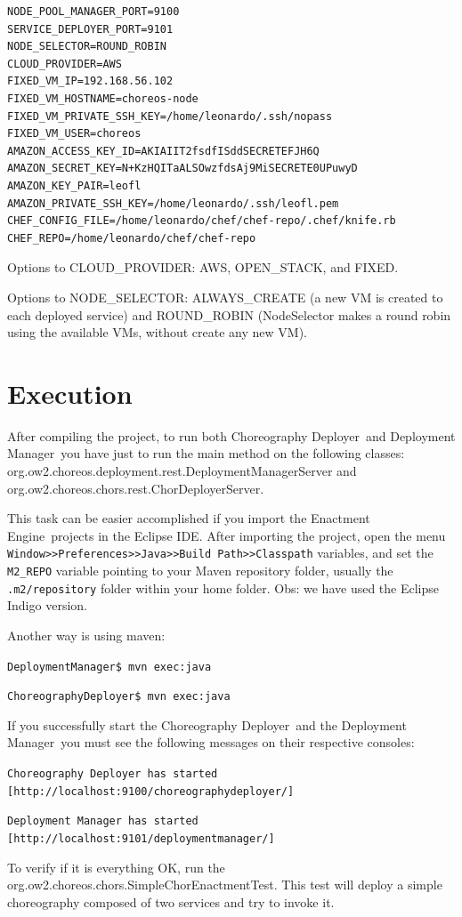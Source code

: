 \documentclass[a4paper, 10pt]{article}
\newcommand{\ee}{Enactment Engine}
\newcommand{\cd}{Choreography Deployer}
\newcommand{\dm}{Deployment Manager}
\begin{document}
\lstset{
numbers=left
}

{\footnotesize
\begin{lstlisting}[caption=deployment.properties example,label=lst:deployment_properties] 
NODE_POOL_MANAGER_PORT=9100
SERVICE_DEPLOYER_PORT=9101
NODE_SELECTOR=ROUND_ROBIN
CLOUD_PROVIDER=AWS
FIXED_VM_IP=192.168.56.102
FIXED_VM_HOSTNAME=choreos-node
FIXED_VM_PRIVATE_SSH_KEY=/home/leonardo/.ssh/nopass
FIXED_VM_USER=choreos
AMAZON_ACCESS_KEY_ID=AKIAIIT2fsdfISddSECRETEFJH6Q
AMAZON_SECRET_KEY=N+KzHQITaALSOwzfdsAj9MiSECRETE0UPuwyD
AMAZON_KEY_PAIR=leofl
AMAZON_PRIVATE_SSH_KEY=/home/leonardo/.ssh/leofl.pem
CHEF_CONFIG_FILE=/home/leonardo/chef/chef-repo/.chef/knife.rb
CHEF_REPO=/home/leonardo/chef/chef-repo
\end{lstlisting}
}

Options to CLOUD\_PROVIDER: AWS, OPEN\_STACK, and FIXED.

Options to NODE\_SELECTOR: ALWAYS\_CREATE (a new VM is created to each deployed service) and ROUND\_ROBIN (\textsf{NodeSelector} makes a round robin using the available VMs, without create any new VM).


\section{Execution}

After compiling the project, to run both \cd\ and \dm\ you have just to run the main method on the following classes: \textsf{org.ow2.choreos.deployment.rest.DeploymentManagerServer} and \textsf{org.ow2.choreos.chors.rest.ChorDeployerServer}.

This task can be easier accomplished if you import the \ee\ projects in the Eclipse IDE. After importing the project, open the menu \texttt{Window>>Preferences>>Java>>Build Path>>Classpath} variables, and set the \texttt{M2\_REPO} variable pointing to your Maven repository folder, usually the \texttt{.m2/repository} folder within your home folder. Obs: we have used the Eclipse Indigo version.

Another way is using maven:

\texttt{DeploymentManager\$ mvn exec:java}

\texttt{ChoreographyDeployer\$ mvn exec:java}

If you successfully start the \cd\ and the \dm\, you must see the following messages on their respective consoles: 

\texttt{\cd\ has started [http://localhost:9100/choreographydeployer/]}

\texttt{\dm\ has started [http://localhost:9101/deploymentmanager/]}

To verify if it is everything OK, run the \textsf{org.ow2.choreos.chors.SimpleChorEnactmentTest}. This test will deploy a simple choreography composed of two services and try to invoke it.
\end{document}

